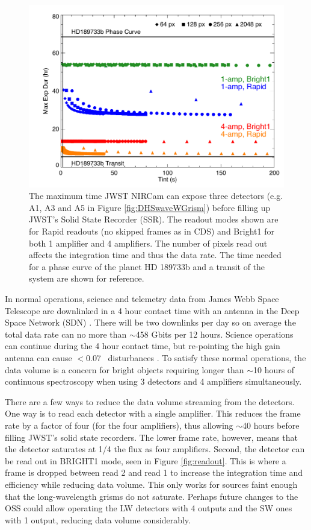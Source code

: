 \documentclass[iop]{emulateapj}
\begin{document}
\begin{figure}[!t]
\includegraphics[width=1.0\columnwidth]{NIRCam_grism_max_exp.pdf}
\caption{The maximum time JWST NIRCam can expose three detectors (e.g. A1, A3 and A5 in Figure \ref{fig:DHSwaveWGrism}) before filling up JWST's Solid State Recorder (SSR). The readout modes shown are for Rapid readouts (no skipped frames as in CDS) and Bright1 for both 1 amplifier and 4 amplifiers. The number of pixels read out affects the integration time and thus the data rate. The time needed for a phase curve of the planet HD 189733b and a transit of the system are shown for reference.}\label{fig:DataVolume}
\end{figure}

In normal operations, science and telemetry data from James Webb Space Telescope are downlinked in a 4 hour contact time with an antenna in the Deep Space Network (SDN)  \citep{dashevsky2008groundflight}.
There will be two downlinks per day so on average the total data rate can no more than $\sim$458 Gbits per 12 hours.
Science operations can continue during the 4 hour contact time, but re-pointing the high gain antenna can cause $<$0.07 \arcsec\ disturbances \citep{beichman2014pasp}.
To satisfy these normal operations, the data volume is a concern for bright objects requiring longer than $\sim$10 hours of continuous spectroscopy when using 3 detectors and 4 amplifiers simultaneously.

There are a few ways to reduce the data volume streaming from the detectors.
One way is to read each detector with a single amplifier.
This reduces the frame rate by a factor of four (for the four amplifiers), thus allowing $\sim$40 hours before filling JWST's solid state recorders.
The lower frame rate, however, means that the detector saturates at 1/4 the flux as four amplifiers.
Second, the detector can be read out in BRIGHT1 mode, seen in Figure \ref{fig:readout}.
This is where a frame is dropped between read 2 and read 1 to increase the integration time and efficiency while reducing data volume.
This only works for sources faint enough that the long-wavelength grisms do not saturate.
Perhaps future changes to the OSS could allow operating the LW detectors with 4 outputs and the SW ones with 1 output, reducing data volume considerably.
\end{document}
